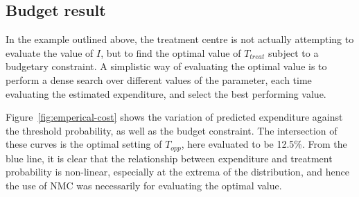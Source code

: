 \subsection{Budget result}
\label{sec:cancer_sim_result}

In the example outlined above, the treatment centre is not actually attempting to evaluate the value of $I$, but to find the optimal value of $T_{treat}$ subject to a budgetary constraint. A simplistic way of evaluating the optimal value is to perform a dense search over different values of the parameter, each time evaluating the estimated expenditure, and select the best performing value.

Figure~\ref{fig:emperical-cost} shows the variation of predicted expenditure against the threshold probability, as well as the budget constraint. The intersection of these curves is the optimal setting of $T_{opp}$, here evaluated to be 12.5\%. From the blue line, it is clear that the relationship between expenditure and treatment probability is non-linear, especially at the extrema of the distribution, and hence the use of NMC was necessarily for evaluating the optimal value. 



